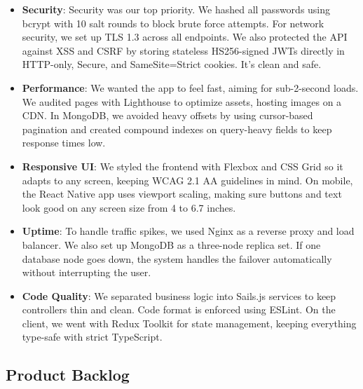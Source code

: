\documentclass[12pt,a4paper]{report}
\begin{document}
\begin{itemize}
    \item \textbf{Security}: Security was our top priority. We hashed all passwords using bcrypt with 10 salt rounds to block brute force attempts. For network security, we set up TLS 1.3 across all endpoints. We also protected the API against XSS and CSRF by storing stateless HS256-signed JWTs directly in HTTP-only, Secure, and SameSite=Strict cookies. It's clean and safe.
    \item \textbf{Performance}: We wanted the app to feel fast, aiming for sub-2-second loads. We audited pages with Lighthouse to optimize assets, hosting images on a CDN. In MongoDB, we avoided heavy offsets by using cursor-based pagination and created compound indexes on query-heavy fields to keep response times low.
    \item \textbf{Responsive UI}: We styled the frontend with Flexbox and CSS Grid so it adapts to any screen, keeping WCAG 2.1 AA guidelines in mind. On mobile, the React Native app uses viewport scaling, making sure buttons and text look good on any screen size from 4 to 6.7 inches.
    \item \textbf{Uptime}: To handle traffic spikes, we used Nginx as a reverse proxy and load balancer. We also set up MongoDB as a three-node replica set. If one database node goes down, the system handles the failover automatically without interrupting the user.
    \item \textbf{Code Quality}: We separated business logic into Sails.js services to keep controllers thin and clean. Code format is enforced using ESLint. On the client, we went with Redux Toolkit for state management, keeping everything type-safe with strict TypeScript.
\end{itemize}

\subsection{Product Backlog}

\renewcommand{\arraystretch}{1.3}
\setlength{\tabcolsep}{8pt}
\end{document}

